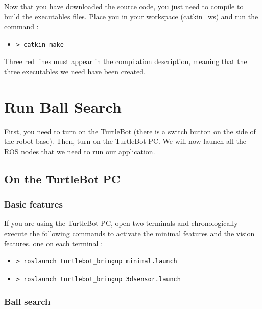 \documentclass[10pt,a4paper]{article}
\begin{document}
Now that you have downloaded the source code, you just need to compile to build the executables files. Place you in your workspace (catkin\_ws) and run the command : 

\begin{itemize}
\item[]  \begin{verbatim}> catkin_make \end{verbatim}
\end{itemize}

Three red lines must appear in the compilation description, meaning that the three executables we need have been created.

\newpage
\section{Run Ball Search}
\label{sec:Run Ball Search}

First, you need to turn on the TurtleBot (there is a switch button on the side of the robot base). Then, turn on the TurtleBot PC. We will now launch all the ROS nodes that we need to run our application.

\subsection{On the TurtleBot PC}

\subsubsection{Basic features}

If you are using the TurtleBot PC, open two terminals and chronologically execute the following commands to activate the minimal features and the vision features, one on each terminal :

\begin{itemize}
\item[]  \begin{verbatim}> roslaunch turtlebot_bringup minimal.launch \end{verbatim}
\item[]  \begin{verbatim}> roslaunch turtlebot_bringup 3dsensor.launch \end{verbatim}
\end{itemize}

\subsubsection{Ball search}
\end{document}
